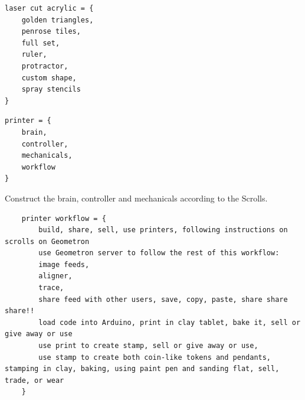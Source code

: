 \begin{verbatim}
laser cut acrylic = {
    golden triangles, 
    penrose tiles, 
    full set, 
    ruler,
    protractor,
    custom shape,
    spray stencils
}
\end{verbatim}

\begin{verbatim}
printer = {
    brain,
    controller,
    mechanicals,
    workflow
}
\end{verbatim}

Construct the brain, controller and mechanicals according to the Scrolls.

\begin{verbatim}
    printer workflow = {
        build, share, sell, use printers, following instructions on scrolls on Geometron
        use Geometron server to follow the rest of this workflow: 
        image feeds,
        aligner,
        trace,
        share feed with other users, save, copy, paste, share share share!!
        load code into Arduino, print in clay tablet, bake it, sell or give away or use
        use print to create stamp, sell or give away or use,
        use stamp to create both coin-like tokens and pendants, stamping in clay, baking, using paint pen and sanding flat, sell, trade, or wear
    }
\end{verbatim}
    